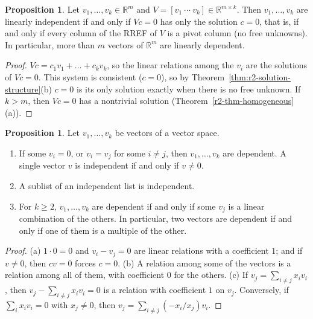 \documentclass[12pt]{article}
\newcommand{\R}{\mathbb R}
\theoremstyle{definition}
\newtheorem{proposition}[theorem]{Proposition}
\begin{document}
\begin{proposition}\label{r3-prop-independence-test}
Let \(v_1,\dots,v_k\in\R^m\) and \(V=[v_1\ \cdots\ v_k]\in\R^{m\times k}\). Then
\(v_1,\dots,v_k\) are linearly independent if and only if \(Vc=0\) has only the solution
\(c=0\), that is, if and only if every column of the RREF of \(V\) is a pivot column (no free
unknowns). In particular, more than \(m\) vectors of \(\R^m\) are linearly dependent.
\end{proposition}
\begin{proof}
\(Vc=c_1v_1+\dots+c_kv_k\), so the linear relations among the \(v_i\) are the solutions of
\(Vc=0\). This system is consistent (\(c=0\)), so by
Theorem~\ref{thm:r2-solution-structure}(b) \(c=0\) is its only solution exactly when there is no
free unknown. If \(k>m\), then \(Vc=0\) has a nontrivial solution (Theorem~\ref{r2-thm-homogeneous}(a)).
\end{proof}

\begin{proposition}\label{r3-prop-dependence}
Let \(v_1,\dots,v_k\) be vectors of a vector space.
\begin{enumerate}
\item If some \(v_i=0\), or \(v_i=v_j\) for some \(i\ne j\), then \(v_1,\dots,v_k\) are
dependent. A single vector \(v\) is independent if and only if \(v\ne0\).
\item A sublist of an independent list is independent.
\item For \(k\geqslant2\), \(v_1,\dots,v_k\) are dependent if and only if some \(v_j\) is a
linear combination of the others. In particular, two vectors are dependent if and only if one
of them is a multiple of the other.
\end{enumerate}
\end{proposition}
\begin{proof}
(a) \(1\cdot0=0\) and \(v_i-v_j=0\) are linear relations with a coefficient \(1\); and if
\(v\ne0\), then \(cv=0\) forces \(c=0\). (b) A relation among some of the vectors is a
relation among all of them, with coefficient \(0\) for the others. (c) If
\(v_j=\sum_{i\ne j}x_iv_i\), then \(v_j-\sum_{i\ne j}x_iv_i=0\) is a relation with coefficient
\(1\) on \(v_j\). Conversely, if \(\sum_ix_iv_i=0\) with \(x_j\ne0\), then
\(v_j=\sum_{i\ne j}(-x_i/x_j)v_i\).
\end{proof}
\end{document}
